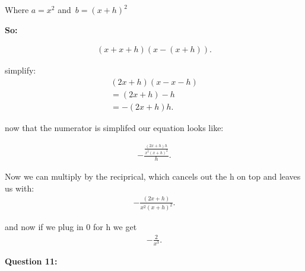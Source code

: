 \documentclass{report}
\begin{document}
    \bigbreak \noindent 
    Where $a = x^2$ and\ $b = (x+h)^2$

    \bigbreak \noindent 
    \textbf{So:}

    \begin{align*}
        \left(x+x+h\right) \left(x-\left(x+h\right)\right)
    .\end{align*}

    \bigbreak \noindent 
    simplify:
    \begin{align*}
        \left(2x+h\right) \left(x-x-h\right) \\
        = \left(2x+h\right) -h  \\
        = - \left(2x+h\right) h
    .\end{align*}

    \bigbreak \noindent 
    now that the numerator is simplifed our equation looks like:

    \begin{align*}
        - \frac{\frac{ \left(2x+h\right)h}{x^2 \left(x+h\right)^2}}{h}
    .\end{align*}

    \bigbreak \noindent 
    Now we can multiply by the reciprical, which cancels out the h on top and leaves us with:
    \begin{align*}
        -\frac{ \left(2x+h\right)}{x^2 \left(x+h\right)^2}
    .\end{align*}

    \bigbreak \noindent 
    and now if we plug in 0 for h we get 
    \begin{align*}
        - \frac{2}{x^3}
    .\end{align*}

    \bigbreak \noindent \bigbreak \noindent 
    \begin{Large}
       \textbf{Question 11:} 
    \end{Large}

    \bigbreak \noindent 
    \noindent  
\end{document}
